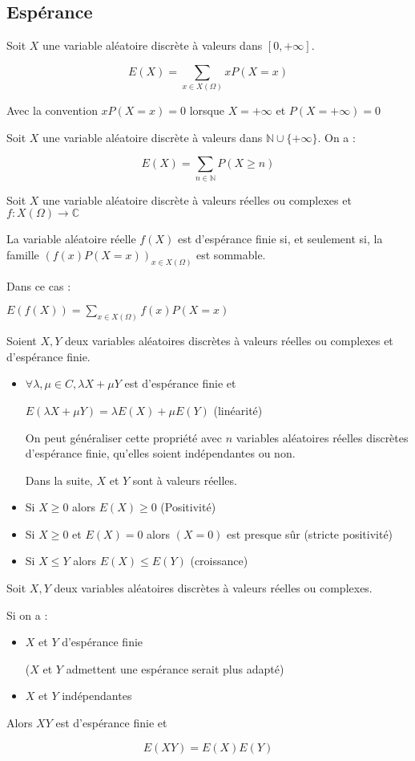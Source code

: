 \documentclass[a4paper,12pt]{book}
\newcommand{\Def}[2]{\begin{tcolorbox}[colback=white,colframe=red!10!green!20!blue!75!, title=Définition : #1]#2\end{tcolorbox}}
\newcommand{\Thr}[2]{\begin{tcolorbox}[sharp corners, colback=white,colframe=red!10!blue!30!green!75!, title=Théorème : #1]#2\end{tcolorbox}}
\def\C{\mathbb{C}}
\def\N{\mathbb{N}}
\begin{document}
\subsection{Espérance}
\Def{}{Soit $X$ une variable aléatoire discrète à valeurs dans $[0, +\infty]$.
\par $$E(X)=\sum\limits_{x\in X(\Omega)}xP(X=x)$$
\par Avec la convention $xP(X=x)=0$ lorsque $X=+\infty$ et $P(X=+\infty)=0$}
\Thr{}{Soit $X$ une variable aléatoire discrète à valeurs dans $\N\cup\{+\infty\}$. On a :
\par $$E(X)=\sum\limits_{n\in\N}P(X\geq n)$$}
\Thr{Transfert}{Soit $X$ une variable aléatoire discrète à valeurs réelles ou complexes et $f:X(\Omega)\to\C$
\par La variable aléatoire réelle $f(X)$ est d'espérance finie si, et seulement si, la famille $(f(x)P(X=x))_{x\in X(\Omega)}$ est sommable.
\par Dans ce cas :
\par\begin{center}$E(f(X))=\sum\limits_{x\in X(\Omega)}f(x)P(X=x)$\end{center}}
\Thr{Propriétés de l'espérance}{Soient $X,Y$ deux variables aléatoires discrètes à valeurs réelles ou complexes et d'espérance finie.\begin{itemize}
\item $\forall \lambda, \mu\in C, \lambda X+\mu Y$ est d'espérance finie et
\par\begin{center}$E(\lambda X+\mu Y)=\lambda E(X)+\mu E(Y)$ (linéarité)\end{center}
\par On peut généraliser cette propriété avec $n$ variables aléatoires réelles discrètes d'espérance finie, qu'elles soient indépendantes ou non.
\par Dans la suite, $X$ et $Y$ sont à valeurs réelles.
\item Si $X\geq 0$ alors $E(X)\geq 0$ (Positivité)
\item Si $X\geq 0$ et $E(X)=0$ alors $(X=0)$ est presque sûr (stricte positivité)
\item Si $X\leq Y$ alors $E(X)\leq E(Y)$ (croissance)
\end{itemize}}
\Thr{Espérance d'un produit de variables indépendantes}{Soit $X,Y$ deux variables aléatoires discrètes à valeurs réelles ou complexes.
\par Si on a :\begin{itemize}
\item $X$ et $Y$ d'espérance finie
\par ($X$ et $Y$ admettent une espérance serait plus adapté)
\item $X$ et $Y$ indépendantes
\end{itemize}
Alors $XY$ est d'espérance finie et
\par $$E(XY)=E(X)E(Y)$$}
\end{document}
